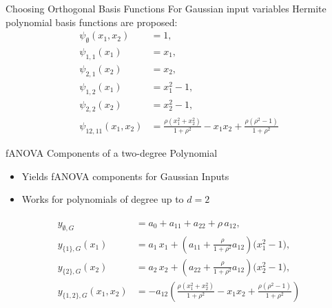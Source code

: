 \begin{frame}{Choosing Orthogonal Basis Functions}
  For Gaussian input variables Hermite polynomial basis functions are proposed:
  \begin{align*}
    \psi_{\emptyset}(x_1,x_2) &= 1, \\[0.5em]
\psi_{1,1}(x_1) &= x_1, \\[0.5em]
\psi_{2,1}(x_2) &= x_2, \\[0.5em]
\psi_{1,2}(x_1) &= x_1^2 - 1, \\[0.5em]
\psi_{2,2}(x_2) &= x_2^2 - 1, \\[0.5em]
\psi_{12,11}(x_1,x_2) &= \frac{\rho (x_1^2 + x_2^2)}{1 + \rho^2} 
                         - x_1 x_2 
                         + \frac{\rho(\rho^2 - 1)}{1 + \rho^2}
\end{align*}
\end{frame}


\begin{frame}{fANOVA Components of a two-degree Polynomial}
  \begin{itemize}
    \item Yields fANOVA components for Gaussian Inputs
    \item Works for polynomials of degree up to $d = 2$
  \end{itemize}
  \begin{align*}
\begin{split}
y_{\emptyset, G} &= a_0 + a_{11} + a_{22} + \rho\,a_{12}, \\[0.5em]
y_{\{1\}, G}(x_1) &= a_1\,x_1 
  + \left(a_{11} + \frac{\rho}{1+\rho^2}a_{12}\right)\bigl(x_1^2 - 1\bigr), \\[0.5em]
y_{\{2\}, G}(x_2) &= a_2\,x_2 
  + \left(a_{22} + \frac{\rho}{1+\rho^2}a_{12}\right)\bigl(x_2^2 - 1\bigr), \\[0.5em]
y_{\{1,2\}, G}(x_1,x_2) 
&= -a_{12}\!\left(
    \frac{\rho(x_1^2+x_2^2)}{1+\rho^2} 
    - x_1 x_2 
    + \frac{\rho(\rho^2-1)}{1+\rho^2}
   \right)
\end{split}
\end{align*}
\end{frame}
  

